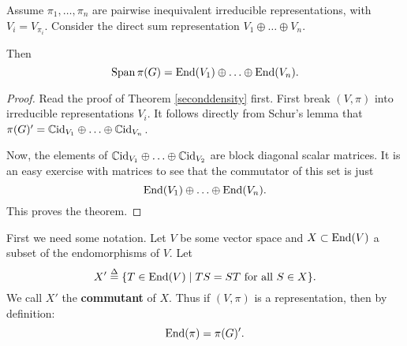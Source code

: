 \documentclass[11pt, english]{article}
\begin{document}
\begin{thm}
\label{thmdensity}
 Assume $\pi_1,\ldots,\pi_n$ are pairwise inequivalent irreducible representations, with $V_i = V_{\pi_i}$. Consider the direct sum representation $V_1 \oplus \ldots \oplus V_n$.

Then
\[ 
\operatorname{Span} {\pi(G)} = \operatorname{End}(V_1) \oplus \ldots \oplus \operatorname{End}(V_n).
\]
\end{thm}
\begin{proof}
Read the proof of Theorem \ref{seconddensity} first. First break $(V,\pi)$ into irreducible representations $V_i$. It follows directly from Schur's lemma that $\pi(G)' = \mathbb{C} \text{id}_{V_1} \oplus \ldots \oplus \mathbb{C} \text{id}_{V_n}$. 

Now, the elements of $\mathbb{C} \text{id}_{V_1} \oplus \ldots \oplus \mathbb{C} \text{id}_{V_2}$ are block diagonal scalar matrices. It is an easy exercise with matrices to see that the commutator of this set is just
$$
\operatorname{End}(V_1) \oplus \ldots \oplus \operatorname{End}(V_n).
$$
This proves the theorem.
\end{proof}

First we need some notation. Let $V$ be some vector space and $X \subset \operatorname{End}(V)$ a subset of the endomorphisms of $V$. Let 
\[
X' \stackrel{\Delta}{=}  \{ T \in \operatorname{End}(V) \mid TS = ST \text{ for all } S \in X \}.
\]
We call $X'$ the \textbf{commutant} of $X$. Thus if $(V,\pi)$ is a representation, then by definition:
\[
\operatorname{End}(\pi) = \pi(G)'.
\]
\end{document}
